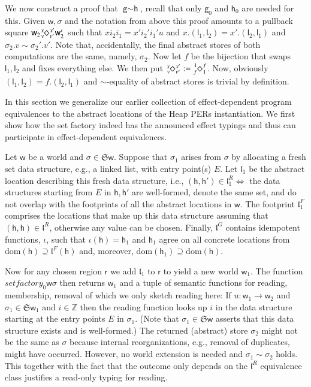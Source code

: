 \documentclass[orivec]{llncs}
\makeatletter
\newif\iffull\fullfalse
\renewcommand\subsection{\@startsection{subsection}{2}{\z@}{-2\p@ \@plus -4\p@ \@minus -4\p@}{-0.5em \@plus -0.22em \@minus -0.1em}{\normalfont\normalsize\bfseries}}
\renewcommand{\paragraph}[1]{\noindent {\bf #1}}
\newcommand{\sq}[4]{\tensor*[^{#1}_{#2}]{\Diamond}{^{#3}_{#4}}}
\newcommand{\dom}[1]{\mathrm{dom}({#1})}
\newcommand{\regid}{\ensuremath{\mathsf{r}}}
\newcommand{\loc}{\mathfrak{l}}
\newcommand{\cloc}{\ensuremath{\mathsf{l}}\xspace}
\newcommand\w{\ensuremath{\mathsf{w}}\xspace}
\newcommand\heap{\ensuremath{\mathsf{h}}\xspace}
\newcommand{\Astores}{\mathfrak{S}}
\makeatother
\begin{document}
We now construct a proof that $\textsf{g}\sim \textsf{h}$, recall that only
$\textsf{g}_0$ and
$\textsf{h}_0$ are needed for this. Given $\w,\sigma$ and the notation from
above this proof amounts to a pullback square
$\w_2\sq{x}{v}{x'}{v'}\w_2'$ such that $xi_2i_1=x'i_2'i_1'u$ and
$x.(\cloc_1,\cloc_2)=x'.(\cloc_2,\cloc_1)$ and $\sigma_2.v \sim
\sigma_2'.v'$. Note that, accidentally, the final abstract stores of
both computations are the same, namely, $\sigma_2$. Now let $f$ be the
bijection that swaps $\cloc_1,\cloc_2$ and fixes everything else. We
then put $\sq{x}{v}{x'}{v'} := \sq{1}{f}{f}{1}$.  Now, obviously
$(\cloc_1,\cloc_2)=f.(\cloc_2,\cloc_1)$ and $\sim$-equality of
abstract stores is trivial by definition.

\subsection{Heap PERs}
In this section we generalize our earlier collection of effect-dependent program
equivalences 
\cite{DBLP:conf/ppdp/BentonKBH07} to the abstract locations of the
Heap PERs instantiation. We first show how the
set factory indeed has the announced effect typings and thus can
participate in effect-dependent equivalences.

\paragraph{Set factory}
Let $\w$ be a world and $\sigma\in\Astores\w$. Suppose that $\sigma_1$
arises from $\sigma$ by allocating a fresh set data structure, e.g., a
linked list, with entry point(s) $E$. Let $\loc_1$ be the abstract
location describing this fresh data structure, i.e.,
$(\heap,\heap')\in\loc_1^R\iff$ the data structures starting from $E$
in $\heap,\heap'$ are well-formed, denote the same set, and do not
overlap with the footprints of all the abstract locations in $\w$. The
footprint $\loc_1^F$ comprises the locations that make up this 
data structure assuming that $(\heap,\heap)\in\loc^R$, otherwise any
value can be chosen. Finally, $\loc^G$ contains idempotent
functions, $\iota$, such that $\iota(\heap) = \heap_1$
and $\heap_1$ agree on all concrete locations from
$\dom{\heap}\supseteq\loc^F(\heap)$ and, moreover,
$\dom{\heap_1}\supseteq \dom\heap$. 

Now for any chosen region $\regid$ we add $\loc_1$ to $\regid$ to
yield a new world $\w_1$. The function $\textit{setfactory}_0\w\sigma$
then returns $\w_1$ and a tuple of semantic functions for reading,
membership, removal of which we only sketch reading here: If
$u:\w_1\rightarrow \w_2$ and $\sigma_1\in\Astores\w_1$ and
$i\in\mathbb{Z}$ then the reading function looks up $i$ in the data
structure starting at the entry points $E$ in $\sigma_1$. (Note that
$\sigma_1\in\Astores\w$ asserts that this data structure exists and is
well-formed.) The returned (abstract) store $\sigma_2$ might not be the
same as $\sigma$ because internal reorganizations, e.g., removal of
duplicates, might have occurred. However, no world extension is needed
and
$\sigma_1\sim\sigma_2$ holds. This together with the fact that
the outcome only depends on the $\loc^R$ equivalence class \iffull(in the
proof-relevant sense)\fi justifies a read-only typing for reading. 
\end{document}
